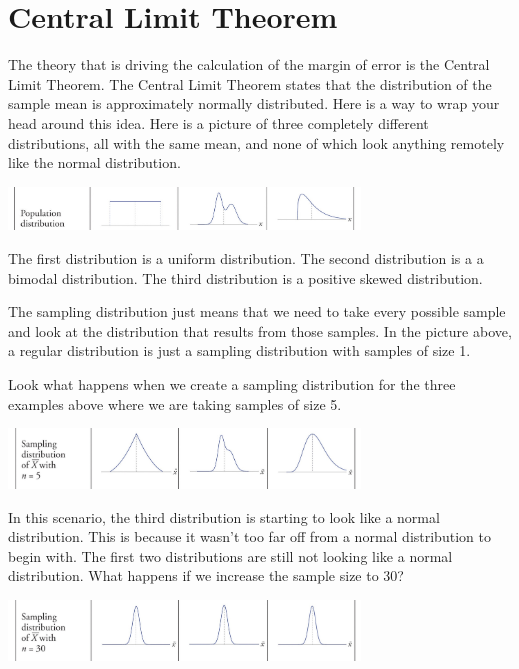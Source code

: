 \documentclass[
  letterpaper,
  DIV=11,
  numbers=noendperiod]{scrreprt}
\begin{document}
\section*{Central Limit Theorem}\label{central-limit-theorem}


The theory that is driving the calculation of the margin of error is the
Central Limit Theorem. The Central Limit Theorem states that the
distribution of the sample mean is approximately normally distributed.
Here is a way to wrap your head around this idea. Here is a picture of
three completely different distributions, all with the same mean, and
none of which look anything remotely like the normal distribution.

\includegraphics[width=0.7\textwidth,height=\textheight]{./images/EPCI_4.jpg}

The first distribution is a uniform distribution. The second
distribution is a a bimodal distribution. The third distribution is a
positive skewed distribution.

The sampling distribution just means that we need to take every possible
sample and look at the distribution that results from those samples. In
the picture above, a regular distribution is just a sampling
distribution with samples of size 1.

Look what happens when we create a sampling distribution for the three
examples above where we are taking samples of size 5.

\includegraphics[width=0.7\textwidth,height=\textheight]{./images/EPCI_5.jpg}

In this scenario, the third distribution is starting to look like a
normal distribution. This is because it wasn't too far off from a normal
distribution to begin with. The first two distributions are still not
looking like a normal distribution. What happens if we increase the
sample size to 30?

\includegraphics[width=0.7\textwidth,height=\textheight]{./images/EPCI_6.jpg}
\end{document}

